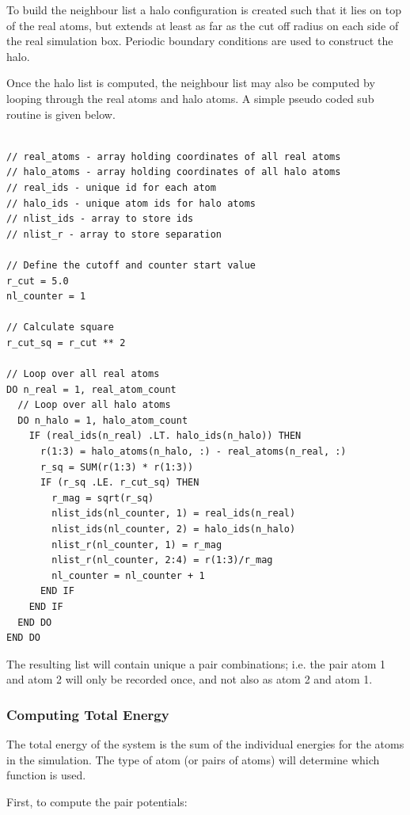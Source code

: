 \documentclass[12pt,twoside]{manual}
\begin{document}
To build the neighbour list a halo configuration is created such that it lies on top of the real atoms, but extends at least as far as the cut off radius on each side of the real simulation box.  Periodic boundary conditions are used to construct the halo.

Once the halo list is computed, the neighbour list may also be computed by looping through the real atoms and halo atoms.  A simple pseudo coded sub routine is given below.


\begin{lstlisting}[style=pseudocode,caption={Simple genetic optimisation subroutine}]

// real_atoms - array holding coordinates of all real atoms
// halo_atoms - array holding coordinates of all halo atoms
// real_ids - unique id for each atom
// halo_ids - unique atom ids for halo atoms
// nlist_ids - array to store ids
// nlist_r - array to store separation

// Define the cutoff and counter start value
r_cut = 5.0
nl_counter = 1

// Calculate square
r_cut_sq = r_cut ** 2

// Loop over all real atoms
DO n_real = 1, real_atom_count
  // Loop over all halo atoms
  DO n_halo = 1, halo_atom_count
    IF (real_ids(n_real) .LT. halo_ids(n_halo)) THEN
      r(1:3) = halo_atoms(n_halo, :) - real_atoms(n_real, :)
      r_sq = SUM(r(1:3) * r(1:3))
      IF (r_sq .LE. r_cut_sq) THEN          
        r_mag = sqrt(r_sq)          
        nlist_ids(nl_counter, 1) = real_ids(n_real)
        nlist_ids(nl_counter, 2) = halo_ids(n_halo)        
        nlist_r(nl_counter, 1) = r_mag
        nlist_r(nl_counter, 2:4) = r(1:3)/r_mag
        nl_counter = nl_counter + 1
      END IF
    END IF
  END DO
END DO 
\end{lstlisting}

The resulting list will contain unique a pair combinations; i.e. the pair atom 1 and atom 2 will only be recorded once, and not also as atom 2 and atom 1.


\subsubsection{Computing Total Energy}

The total energy of the system is the sum of the individual energies for the atoms in the simulation.  The type of atom (or pairs of atoms) will determine which function is used.

First, to compute the pair potentials:
\end{document}
